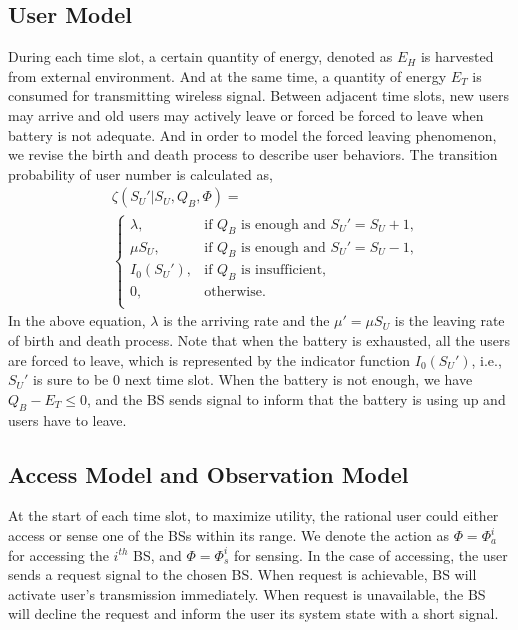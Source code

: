\documentclass[conference]{IEEEtran}
\begin{document}
\subsection{User Model}
During each time slot, a certain quantity of energy, denoted as \(E_H\) is harvested from external environment.
And at the same time, a quantity of energy \(E_T\) is consumed for transmitting wireless signal.
Between adjacent time slots, new users may arrive and
old users may actively leave or forced be forced to leave when battery is not adequate.
And in order to model the forced leaving phenomenon,
we revise the birth and death process to describe user behaviors.
The transition probability of user number is calculated as,
\begin{align}\label{formula1}
&\zeta\left(S_U'| S_U, Q_B, \Phi\right) = \nonumber\\
&\begin{cases}
	\lambda, &\mbox{if $Q_B$ is enough and $S_U' = S_U + 1$,}\\
	\mu S_U, &\mbox{if $Q_B$ is enough and $S_U' = S_U - 1$,}\\
	I_0\left(S_U'\right), &\mbox{if $Q_B$ is insufficient,}\\
	0, &\mbox{otherwise.}\\
\end{cases}
\end{align}
In the above equation, \(\lambda\) is the arriving rate and
the \(\mu' = \mu S_U\) is the leaving rate of birth and death process.
Note that when the battery is exhausted, all the users are forced to leave,
which is represented by the indicator function \(I_0\left(S_U'\right)\),
i.e., \(S_U'\) is sure to be \(0\) next time slot.
When the battery is not enough, we have \(Q_B- E_T \leq 0\), 
and the BS sends signal to inform that the battery is using up and users have to leave.
\subsection{Access Model and Observation Model}
At the start of each time slot,
to maximize utility, the rational user could either access or sense one of the BSs within its range.
We denote the action as \(\Phi = \Phi_{a}^i\) for accessing the \(i^{th}\) BS,
and \(\Phi = \Phi_{s}^i\) for sensing.
In the case of accessing, the user sends a request signal to the chosen BS.
When request is achievable, BS will activate user's transmission immediately.
When request is unavailable, the BS will decline the request and
inform the user its system state with a short signal.
\end{document}
